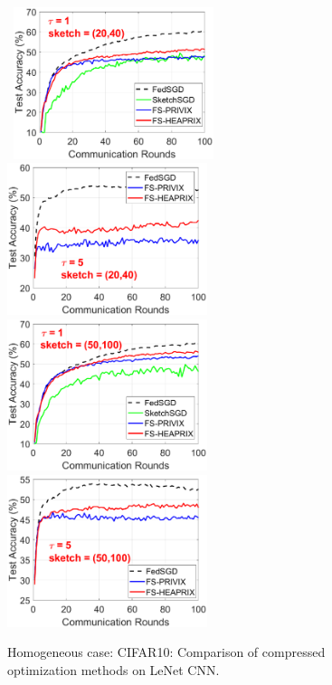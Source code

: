 \documentclass{article} %
\begin{document}
\begin{figure}[h]
	\begin{center}
		\mbox{%
		\includegraphics[width=2.3in]{CIFAR_figures/cifar_local1_sketch20_iid1_test_acc.eps}  
		 \includegraphics[width=2.3in]{CIFAR_figures/cifar_local5_sketch20_iid1_test_acc.eps}
		}
		\mbox{%
	\includegraphics[width=2.3in]{CIFAR_figures/cifar_local1_sketch50_iid1_test_acc.eps} 
		\includegraphics[width=2.3in]{CIFAR_figures/cifar_local5_sketch50_iid1_test_acc.eps}
		}
	\end{center}
	\caption{Homogeneous case: CIFAR10: Comparison of compressed optimization methods on LeNet CNN.}
    \label{fig:CIFAR-homog}
\end{figure}
\end{document}
